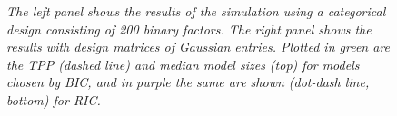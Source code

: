 \documentclass{imsart}
\begin{document}
\begin{figure}
\begin{center}
\hspace{-15pt}
\caption{\small \it The left panel shows the results of the simulation
  using a categorical design consisting of 200 binary factors.
  The right panel shows the results with design matrices of Gaussian
  entries. Plotted in green are the TPP (dashed line) and median model
  sizes (top) for models chosen by BIC, and in purple the same are shown
  (dot-dash line, bottom) for RIC.}
\label{fig:fwdstepsim}
\end{center}
\end{figure}
\end{document}
